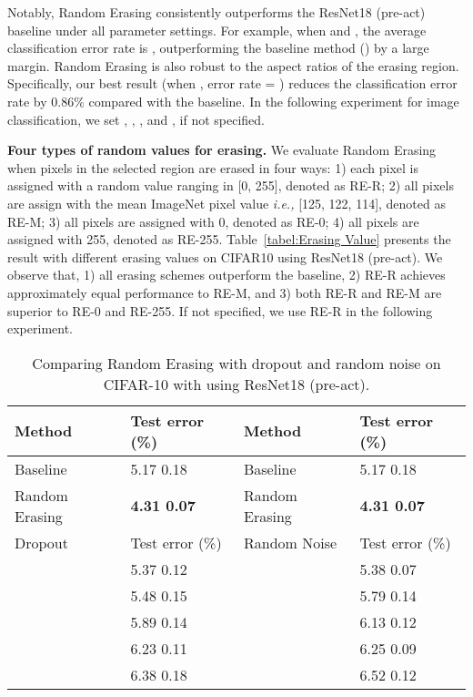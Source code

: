 \documentclass[10pt,twocolumn,letterpaper]{article}
\begin{document}
Notably, Random Erasing consistently outperforms the ResNet18 (pre-act) baseline under all parameter settings. For example, when  and , the average classification error rate is , outperforming the baseline method () by a large margin. Random Erasing is also robust to the aspect ratios of the erasing region. Specifically, our best result (when , error rate = ) reduces the classification error rate by 0.86\% compared with the baseline. In the following experiment for image classification, we set , , , and , if not specified.




\textbf{Four types of random values for erasing.} 
We evaluate Random Erasing when pixels in the selected region are erased in four ways: 1) each pixel is assigned with a random value ranging in [0, 255], denoted as RE-R; 2) all pixels are assign with the mean ImageNet pixel value \emph{i.e.,} [125, 122, 114], denoted as RE-M; 3) all pixels are assigned with 0, denoted as RE-0; 4) all pixels are assigned with 255, denoted as RE-255. Table~\ref{tabel:Erasing Value} presents the result with different erasing values on CIFAR10 using ResNet18 (pre-act). We observe that, 1) all erasing schemes outperform the baseline, 2) RE-R achieves approximately equal performance to RE-M, and 3) both RE-R and RE-M are superior to RE-0 and RE-255. If not specified, we use RE-R in the following experiment.





\begin{table}
\footnotesize
\begin{center}
\begin{tabularx}{\linewidth}{ >{\scriptsize}l|>{\scriptsize}C|| >{\scriptsize}l|>{\scriptsize}C }
\hline
Method & Test error (\%) & Method & Test error (\%) \\
\hline
\hline
Baseline & 5.17   0.18 & Baseline & 5.17   0.18\\
Random Erasing & \textbf{4.31  0.07} & Random Erasing & \textbf{4.31  0.07} \\
\hline 
\hline
Dropout & Test error (\%) & Random Noise & Test error (\%) \\
\hline 
\hline 
 & 5.37  0.12 &  & 5.38  0.07 \\ 
 & 5.48  0.15 &  & 5.79  0.14\\ 
 & 5.89  0.14 &  & 6.13  0.12\\ 
 & 6.23  0.11 &  & 6.25  0.09\\ 
 & 6.38  0.18 &  & 6.52  0.12\\
\hline 
\end{tabularx}
\end{center}
\vspace{-.1in}
\caption{\label{tabel:dropout and noise} Comparing Random Erasing with dropout and random noise on CIFAR-10 with using ResNet18 (pre-act).}
\end{table}
\end{document}
